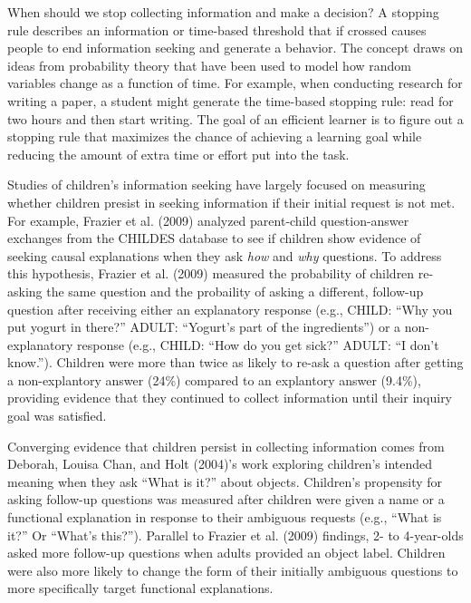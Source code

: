 \documentclass[english,floatsintext,man]{apa6}
\theoremstyle{definition}
\theoremstyle{definition}
\theoremstyle{definition}
\theoremstyle{remark}
\begin{document}
When should we stop collecting information and make a decision? A
stopping rule describes an information or time-based threshold that if
crossed causes people to end information seeking and generate a
behavior. The concept draws on ideas from probability theory that have
been used to model how random variables change as a function of time.
For example, when conducting research for writing a paper, a student
might generate the time-based stopping rule: read for two hours and then
start writing. The goal of an efficient learner is to figure out a
stopping rule that maximizes the chance of achieving a learning goal
while reducing the amount of extra time or effort put into the task.

Studies of children's information seeking have largely focused on
measuring whether children presist in seeking information if their
initial request is not met. For example, Frazier et al. (2009) analyzed
parent-child question-answer exchanges from the CHILDES database to see
if children show evidence of seeking causal explanations when they ask
\emph{how} and \emph{why} questions. To address this hypothesis, Frazier
et al. (2009) measured the probability of children re-asking the same
question and the probaility of asking a different, follow-up question
after receiving either an explanatory response (e.g., CHILD:
\enquote{Why you put yogurt in there?} ADULT: \enquote{Yogurt's part of
the ingredients}) or a non-explanatory response (e.g., CHILD:
\enquote{How do you get sick?} ADULT: \enquote{I don't know.}). Children
were more than twice as likely to re-ask a question after getting a
non-explantory answer (24\%) compared to an explantory answer (9.4\%),
providing evidence that they continued to collect information until
their inquiry goal was satisfied.

Converging evidence that children persist in collecting information
comes from Deborah, Louisa Chan, and Holt (2004)'s work exploring
children's intended meaning when they ask \enquote{What is it?} about
objects. Children's propensity for asking follow-up questions was
measured after children were given a name or a functional explanation in
response to their ambiguous requests (e.g., \enquote{What is it?} Or
\enquote{What's this?}). Parallel to Frazier et al. (2009) findings, 2-
to 4-year-olds asked more follow-up questions when adults provided an
object label. Children were also more likely to change the form of their
initially ambiguous questions to more specifically target functional
explanations.
\end{document}
